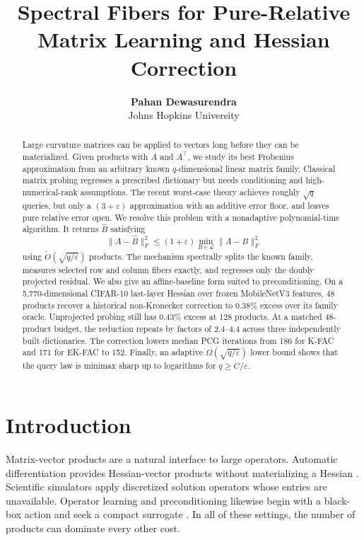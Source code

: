 \documentclass{article}
\title{Spectral Fibers for Pure-Relative Matrix Learning and Hessian Correction}
\author{\textbf{Pahan Dewasurendra} \\ Johns Hopkins University}
\theoremstyle{remark}
\newcommand{\cL}{\mathcal L}
\newcommand{\eps}{\varepsilon}
\newcommand{\wtO}{\widetilde O}
\newcommand{\1}{\mathbf 1}
\begin{document}
\maketitle

\begin{abstract}
Large curvature matrices can be applied to vectors long before they can be materialized.  Given products with $A$ and $A^\top$, we study its best Frobenius approximation from an arbitrary known $q$-dimensional linear matrix family.  Classical matrix probing regresses a prescribed dictionary but needs conditioning and high-numerical-rank assumptions.  The recent worst-case theory achieves roughly $\sqrt q$ queries, but only a $(3+\eps)$ approximation with an additive error floor, and leaves pure relative error open.  We resolve this problem with a nonadaptive polynomial-time algorithm.  It returns $\widehat B$ satisfying \[ \|A-\widehat B\|_F^2\le(1+\eps) \min_{B\in\cL}\|A-B\|_F^2 \] using $\wtO(\sqrt{q/\eps})$ products.  The mechanism spectrally splits the known family, measures selected row and column fibers exactly, and regresses only the doubly projected residual.  We also give an affine-baseline form suited to preconditioning.  On a 5,770-dimensional CIFAR-10 last-layer Hessian over frozen MobileNetV3 features, 48 products recover a historical non-Kronecker correction to 0.38\% excess over its family oracle.  Unprojected probing still has 0.43\% excess at 128 products.  At a matched 48-product budget, the reduction repeats by factors of 2.4--4.4 across three independently built dictionaries.  The correction lowers median PCG iterations from 186 for K-FAC and 171 for EK-FAC to 152.  Finally, an adaptive $\Omega(\sqrt{q/\eps})$ lower bound shows that the query law is minimax sharp up to logarithms for $q\ge C/\eps$.
\end{abstract}

\section{Introduction}

Matrix-vector products are a natural interface to large operators.  Automatic differentiation provides Hessian-vector products without materializing a Hessian \citep{pearlmutter1994hessian}.  Scientific simulators apply discretized solution operators whose entries are unavailable.  Operator learning and preconditioning likewise begin with a black-box action and seek a compact surrogate \citep{boulle2024operator,boulle2024adjoint}.  In all of these settings, the number of products can dominate every other cost.
\end{document}
